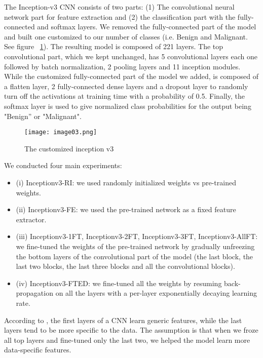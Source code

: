 \documentclass{article}
\begin{document}
The Inception-v3 CNN consists of two parts:
(1) The convolutional neural network part for feature extraction and (2) the classification part with the fully-connected and softmax layers. We removed the fully-connected part of the model and built one customized to our number of classes (i.e. Benign and Malignant. See figure ~\ref{fig:CNN}).
The resulting model is composed of 221 layers. The top convolutional part, which we kept unchanged, has 5 convolutional layers  each one followed by batch normalization, 2 pooling layers and 11 inception modules. While the customized fully-connected part of the model we added, is composed of a flatten layer, 2 fully-connected dense layers and a dropout layer to randomly turn off the activations at training time with a probability of 0.5. Finally, the softmax layer is used to give normalized class probabilities for the output being "Benign” or "Malignant".
\begin{figure}[h]
  \centering
  \texttt{[image: image03.png]}
  \caption{The customized inception v3}
  \label{fig:CNN}
\end{figure}
We conducted four main experiments:
\begin{itemize}
\item (i) Inceptionv3-RI: we used randomly initialized weights vs pre-trained weights.
\item (ii) Inceptionv3-FE: we used the pre-trained network as a fixed feature extractor.
\item (iii) Inceptionv3-1FT, Inceptionv3-2FT, Inceptionv3-3FT, Inceptionv3-AllFT: we fine-tuned the weights of the pre-trained network by gradually unfreezing the bottom layers of the convolutional part of the model (the last block, the last two blocks, the last three blocks and all the convolutional blocks).
\item (iv) Inceptionv3-FTED: we fine-tuned all the weights by resuming back-propagation on all the layers with a per-layer exponentially decaying learning rate.
\end{itemize}

According to \citep{yosinski2014transferable}, the first layers of a CNN learn generic features, while the last layers tend to be more specific to the data. The assumption is that when we froze all top layers and fine-tuned only the last two, we helped the model learn more data-specific features.
\end{document}
